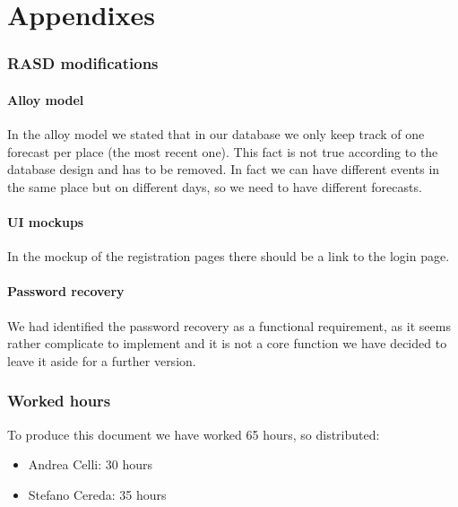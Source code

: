 \documentclass[10pt,a4paper,titlepage]{article}
\begin{document}
\clearpage
\part{Appendixes}
\label{part:appendixes}
\section{RASD modifications}
\subsection{Alloy model}
In the alloy model we stated that in our database we only keep track of one forecast per place (the most recent one). This fact is not true according to the database design and has to be removed. In fact we can have different events in the same place but on different days, so we need to have different forecasts.
\subsection{UI mockups}
In the mockup of the registration pages there should be a link to the login page. 
\subsection{Password recovery}
We had identified the password recovery as a functional requirement, as it seems rather complicate to implement and it is not a core function we have decided to leave it aside for a further version.

\section{Worked hours}
To produce this document we have worked 65 hours, so distributed:
\begin{itemize}
\item Andrea Celli: 30 hours
\item Stefano Cereda: 35 hours
\end{itemize}

\clearpage
\tableofcontents
\end{document}
